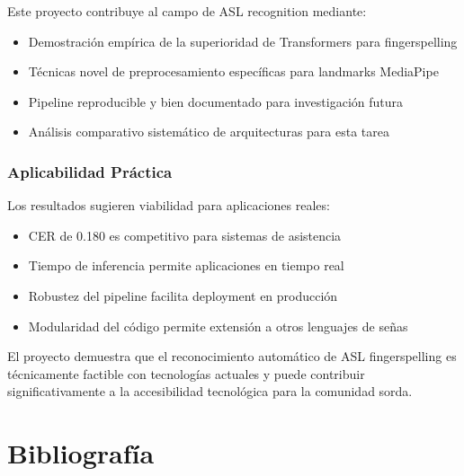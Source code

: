 \documentclass[12pt,a4paper]{article}
\begin{document}
Este proyecto contribuye al campo de ASL recognition mediante:

\begin{itemize}
    \item Demostración empírica de la superioridad de Transformers para fingerspelling
    \item Técnicas novel de preprocesamiento específicas para landmarks MediaPipe  
    \item Pipeline reproducible y bien documentado para investigación futura
    \item Análisis comparativo sistemático de arquitecturas para esta tarea
\end{itemize}

\subsubsection{Aplicabilidad Práctica}

Los resultados sugieren viabilidad para aplicaciones reales:

\begin{itemize}
    \item CER de 0.180 es competitivo para sistemas de asistencia
    \item Tiempo de inferencia permite aplicaciones en tiempo real
    \item Robustez del pipeline facilita deployment en producción
    \item Modularidad del código permite extensión a otros lenguajes de señas
\end{itemize}

El proyecto demuestra que el reconocimiento automático de ASL fingerspelling es técnicamente factible con tecnologías actuales y puede contribuir significativamente a la accesibilidad tecnológica para la comunidad sorda.

\section{Bibliografía}
\end{document}
